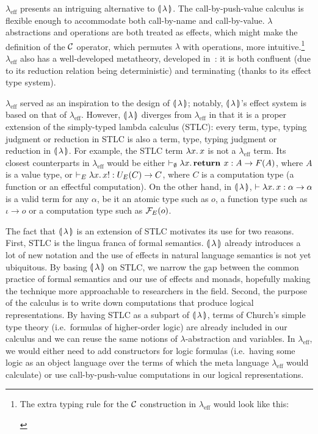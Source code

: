 \begin{itemize}
  $\lambda_{\mathrm{eff}}$ presents an intriguing alternative to
  $\calc$. The call-by-push-value calculus is flexible enough to
  accommodate both call-by-name and call-by-value. $\lambda$ abstractions
  and operations are both treated as effects, which might make the
  definition of the $\CC$ operator, which permutes $\lambda$ with
  operations, more intuitive.\footnote{The extra typing rule for the $\CC$
    construction in $\lambda_{\mathrm{eff}}$ would look like this:
    \begin{prooftree}
    \end{prooftree}} $\lambda_{\mathrm{eff}}$ also has a well-developed
  metatheory, developed in~\cite{kammar2013handlers}: it is both confluent
  (due to its reduction relation being deterministic) and terminating
  (thanks to its effect type system).

  $\lambda_{\mathrm{eff}}$ served as an inspiration to the design of
  $\calc$; notably, $\calc$'s effect system is based on that of
  $\lambda_{\mathrm{eff}}$. However, $\calc$ diverges from
  $\lambda_{\mathrm{eff}}$ in that it is a proper extension of the
  simply-typed lambda calculus (STLC): every term, type, typing judgment or
  reduction in STLC is also a term, type, typing judgment or reduction in
  $\calc$. For example, the STLC term $\lam{x}{x}$ is not a
  $\lambda_{\mathrm{eff}}$ term. Its closest counterparts in
  $\lambda_{\mathrm{eff}}$ would be either
  $\vdash_\emptyset \lam{x}{\textbf{return } x} : A \to F(A)$, where $A$ is
  a value type, or $\vdash_E \lam{x}{x!} : U_E(C) \to C$, where $C$ is a
  computation type (a function or an effectful computation). On the other
  hand, in $\calc$, $\vdash \lam{x}{x} : \alpha \to \alpha$ is a valid term
  for any $\alpha$, be it an atomic type such as $o$, a function type such
  as $\iota \to o$ or a computation type such as $\FF_E(o)$.

  The fact that $\calc$ is an extension of STLC motivates its use for two
  reasons. First, STLC is the lingua franca of formal semantics. $\calc$
  already introduces a lot of new notation and the use of effects in
  natural language semantics is not yet ubiquitous. By basing $\calc$ on
  STLC, we narrow the gap between the common practice of formal semantics
  and our use of effects and monads, hopefully making the technique more
  approachable to researchers in the field. Second, the purpose of the
  calculus is to write down computations that produce logical
  representations. By having STLC as a subpart of $\calc$, terms of
  Church's simple type theory (i.e.\ formulas of higher-order logic) are
  already included in our calculus and we can reuse the same notions of
  $\lambda$-abstraction and variables. In $\lambda_{\mathrm{eff}}$, we
  would either need to add constructors for logic formulas (i.e.\ having
  some logic as an object language over the terms of which the meta
  language $\lambda_{\mathrm{eff}}$ would calculate) or use
  call-by-push-value computations in our logical representations.


\end{itemize}
